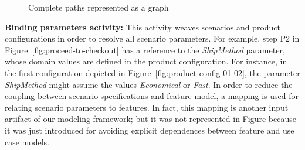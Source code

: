 \documentclass{acm_proc_article-sp}
\begin{document}
 
\begin{figure}[bth]
\begin{center}
\begin{tiny}
\begin{xy}
\end{xy}
\end{tiny}
\caption{Complete paths represented  as a graph}
\label{fig:complete-paths}
\end{center}
\end{figure}

{\bf Binding parameters activity:}  This activity weaves scenarios and product configurations in order to resolve all scenario parameters. 
For example, step P2 in Figure~\ref{fig:proceed-to-checkout} has a reference 
 to the \emph{ShipMethod} parameter, whose domain values are defined in the product configuration. For instance, in the first configuration depicted in Figure~\ref{fig:product-config-01-02}, the parameter \emph{ShipMethod} might assume the values \emph{Economical} or \emph{Fast}. 
In order to reduce the coupling between scenario specifications and feature model, a mapping is used for relating scenario parameters to features. In fact, this mapping is another input artifact of our modeling framework; but it was not represented in Figure because it was just introduced for avoiding explicit dependences between feature and use case models.  


% 
\end{document}
